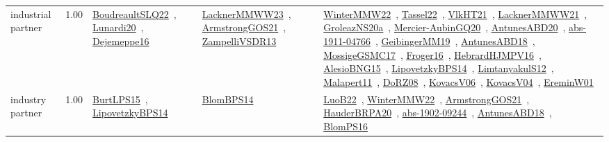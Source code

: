 {\begin{longtable}{p{3cm}r>{\raggedright\arraybackslash}p{6cm}>{\raggedright\arraybackslash}p{6cm}>{\raggedright\arraybackslash}p{8cm}}
\index{industrial partner}\index{Benchmarks!industrial partner}industrial partner &  1.00 & \href{../works/BoudreaultSLQ22.pdf}{BoudreaultSLQ22}~\cite{BoudreaultSLQ22}, \href{../works/Lunardi20.pdf}{Lunardi20}~\cite{Lunardi20}, \href{../works/Dejemeppe16.pdf}{Dejemeppe16}~\cite{Dejemeppe16} & \href{../works/LacknerMMWW23.pdf}{LacknerMMWW23}~\cite{LacknerMMWW23}, \href{../works/ArmstrongGOS21.pdf}{ArmstrongGOS21}~\cite{ArmstrongGOS21}, \href{../works/ZampelliVSDR13.pdf}{ZampelliVSDR13}~\cite{ZampelliVSDR13} & \href{../works/WinterMMW22.pdf}{WinterMMW22}~\cite{WinterMMW22}, \href{../works/Tassel22.pdf}{Tassel22}~\cite{Tassel22}, \href{../works/VlkHT21.pdf}{VlkHT21}~\cite{VlkHT21}, \href{../works/LacknerMMWW21.pdf}{LacknerMMWW21}~\cite{LacknerMMWW21}, \href{../works/GroleazNS20a.pdf}{GroleazNS20a}~\cite{GroleazNS20a}, \href{../works/Mercier-AubinGQ20.pdf}{Mercier-AubinGQ20}~\cite{Mercier-AubinGQ20}, \href{../works/AntunesABD20.pdf}{AntunesABD20}~\cite{AntunesABD20}, \href{../works/abs-1911-04766.pdf}{abs-1911-04766}~\cite{abs-1911-04766}, \href{../works/GeibingerMM19.pdf}{GeibingerMM19}~\cite{GeibingerMM19}, \href{../works/AntunesABD18.pdf}{AntunesABD18}~\cite{AntunesABD18}, \href{../works/MossigeGSMC17.pdf}{MossigeGSMC17}~\cite{MossigeGSMC17}, \href{../works/Froger16.pdf}{Froger16}~\cite{Froger16}, \href{../works/HebrardHJMPV16.pdf}{HebrardHJMPV16}~\cite{HebrardHJMPV16}, \href{../works/AlesioBNG15.pdf}{AlesioBNG15}~\cite{AlesioBNG15}, \href{../works/LipovetzkyBPS14.pdf}{LipovetzkyBPS14}~\cite{LipovetzkyBPS14}, \href{../works/LimtanyakulS12.pdf}{LimtanyakulS12}~\cite{LimtanyakulS12}, \href{../works/Malapert11.pdf}{Malapert11}~\cite{Malapert11}, \href{../works/DoRZ08.pdf}{DoRZ08}~\cite{DoRZ08}, \href{../works/KovacsV06.pdf}{KovacsV06}~\cite{KovacsV06}, \href{../works/KovacsV04.pdf}{KovacsV04}~\cite{KovacsV04}, \href{../works/EreminW01.pdf}{EreminW01}~\cite{EreminW01}\\
\index{industry partner}\index{Benchmarks!industry partner}industry partner &  1.00 & \href{../works/BurtLPS15.pdf}{BurtLPS15}~\cite{BurtLPS15}, \href{../works/LipovetzkyBPS14.pdf}{LipovetzkyBPS14}~\cite{LipovetzkyBPS14} & \href{../works/BlomBPS14.pdf}{BlomBPS14}~\cite{BlomBPS14} & \href{../works/LuoB22.pdf}{LuoB22}~\cite{LuoB22}, \href{../works/WinterMMW22.pdf}{WinterMMW22}~\cite{WinterMMW22}, \href{../works/ArmstrongGOS21.pdf}{ArmstrongGOS21}~\cite{ArmstrongGOS21}, \href{../works/HauderBRPA20.pdf}{HauderBRPA20}~\cite{HauderBRPA20}, \href{../works/abs-1902-09244.pdf}{abs-1902-09244}~\cite{abs-1902-09244}, \href{../works/AntunesABD18.pdf}{AntunesABD18}~\cite{AntunesABD18}, \href{../works/BlomPS16.pdf}{BlomPS16}~\cite{BlomPS16}\\

\end{longtable}}
